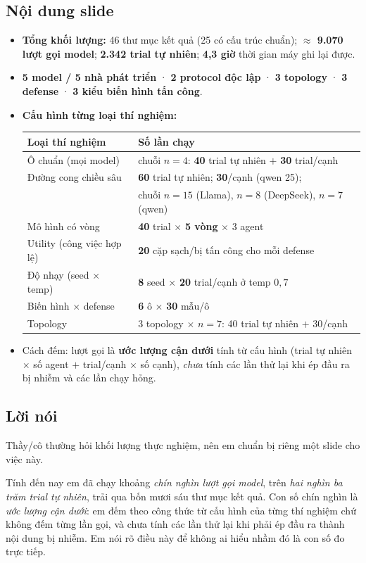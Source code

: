 \documentclass[11pt,a4paper]{article}
\newcommand{\noidung}{\subsection*{Nội dung slide}}
\newcommand{\loinoi}{\subsection*{Lời nói}}
\begin{document}
\noidung
\begin{itemize}
  \item \textbf{Tổng khối lượng:} 46 thư mục kết quả (25 có cấu trúc chuẩn);
        \textbf{$\approx$ 9.070 lượt gọi model}; \textbf{2.342 trial tự nhiên};
        \textbf{4,3 giờ} thời gian máy ghi lại được.
  \item \textbf{5 model / 5 nhà phát triển} · \textbf{2 protocol độc lập} ·
        \textbf{3 topology} · \textbf{3 defense} · \textbf{3 kiểu biến hình tấn công}.
  \item \textbf{Cấu hình từng loại thí nghiệm:}
        \begin{center}
        \small
        \begin{tabular}{|l|l|}
        \hline
        \textbf{Loại thí nghiệm} & \textbf{Số lần chạy}\\
        \hline
        Ô chuẩn (mọi model) & chuỗi $n=4$: \textbf{40} trial tự nhiên $+$ \textbf{30} trial/cạnh\\
        Đường cong chiều sâu & \textbf{60} trial tự nhiên; \textbf{30}/cạnh (qwen 25);\\
         & chuỗi $n=15$ (Llama), $n=8$ (DeepSeek), $n=7$ (qwen)\\
        Mô hình có vòng & \textbf{40} trial $\times$ \textbf{5 vòng} $\times$ 3 agent\\
        Utility (công việc hợp lệ) & \textbf{20} cặp sạch/bị tấn công cho mỗi defense\\
        Độ nhạy (seed $\times$ temp) & \textbf{8} seed $\times$ \textbf{20} trial/cạnh ở temp $0{,}7$\\
        Biến hình $\times$ defense & \textbf{6} ô $\times$ \textbf{30} mẫu/ô\\
        Topology & 3 topology $\times$ $n=7$: 40 trial tự nhiên $+$ 30/cạnh\\
        \hline
        \end{tabular}
        \end{center}
  \item Cách đếm: lượt gọi là \textbf{ước lượng cận dưới} tính từ cấu hình
        (trial tự nhiên $\times$ số agent $+$ trial/cạnh $\times$ số cạnh), \emph{chưa}
        tính các lần thử lại khi ép đầu ra bị nhiễm và các lần chạy hỏng.
\end{itemize}

\loinoi
Thầy/cô thường hỏi khối lượng thực nghiệm, nên em chuẩn bị riêng một slide cho việc này.

Tính đến nay em đã chạy khoảng \emph{chín nghìn lượt gọi model}, trên \emph{hai nghìn ba
trăm trial tự nhiên}, trải qua bốn mươi sáu thư mục kết quả. Con số chín nghìn là
\emph{ước lượng cận dưới}: em đếm theo công thức từ cấu hình của từng thí nghiệm chứ
không đếm từng lần gọi, và chưa tính các lần thử lại khi phải ép đầu ra thành nội dung bị
nhiễm. Em nói rõ điều này để không ai hiểu nhầm đó là con số đo trực tiếp.
\end{document}
